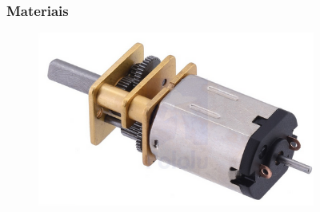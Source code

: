 \begin{frame}
\vspace{-0.4cm}
\begin{figure}[noframenumbering]
	\frametitle{Materiais}
     \centering
     \captionsetup{width=\textwidth,font=footnotesize,textfont=bf}
     \begin{subfigure}[b]{0.2\textwidth}
 	\centering
         \includegraphics[width=\textwidth,height=\textheight,keepaspectratio]{Figuras/motor.png}
         \caption{\centering \label{fig:Posicaofinal}}
     \end{subfigure}
     ~
     \pause
     \begin{subfigure}[b]{0.2\textwidth}
 	\centering

\end{subfigure}
\end{figure}
\end{frame}
